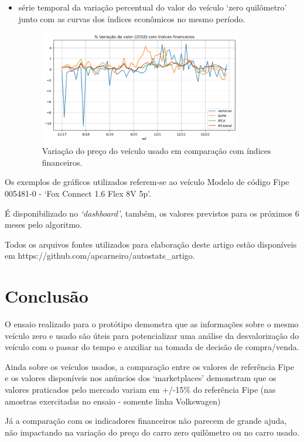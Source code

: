 \documentclass[conference]{IEEEtran}
\begin{document}
\begin{itemize}
	
	\item série temporal da variação percentual do valor do veículo `zero quilômetro' junto com as curvas dos índices econômicos no mesmo período.
	
	
	\begin{figure}[h!]
		\centerline{\includegraphics[width=250pt]{assets/varUsado.png}}
		\caption{Variação do preço do veículo usado em comparação com índices financeiros.}
		\label{fig6}
	\end{figure}
	
\end{itemize}

Os exemplos de gráficos utilizados referem-se ao veículo Modelo de código Fipe 005481-0 - `Fox Connect 1.6 Flex 8V 5p'.

É disponibilizado no \textit{`dashboard'}, também, os valores previstos para os próximos 6 meses pelo algoritmo.

Todos os arquivos fontes utilizados para elaboração deste artigo estão disponíveis em https://github.com/apcarneiro/autostats\_artigo.

\section{Conclusão}

O ensaio realizado para o protótipo demonstra que as informações sobre o mesmo veículo zero e usado são úteis para potencializar uma análise da desvalorização do veículo com o passar do tempo e auxiliar na tomada de decisão de compra/venda.

Ainda sobre os veículos usados, a comparação entre os valores de referência Fipe e os valores disponíveis nos anúncios dos `marketplaces' demonstram que os valores praticados pelo mercado variam em +/-15\% do referência Fipe (nas amostras exercitadas no ensaio - somente linha Volkswagen)

Já a comparação com os indicadores financeiros não parecem de grande ajuda, não impactando na variação do preço do carro zero quilômetro ou no carro usado.
\end{document}
